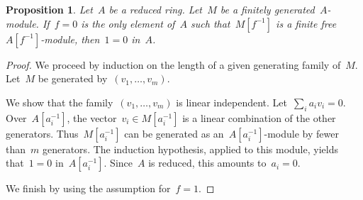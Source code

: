 \documentclass{amsart}
\theoremstyle{definition}
\theoremstyle{plain}
\newtheorem{prop}[defn]{Proposition}
\theoremstyle{remark}
\begin{document}
\begin{prop}Let~$A$ be a reduced ring. Let~$M$ be a finitely
generated~$A$-module. If~$f = 0$ is the only element of~$A$ such
that~$M[f^{-1}]$ is a finite free~$A[f^{-1}]$-module, then~$1 = 0$ in~$A$.
\end{prop}

\begin{proof}We proceed by induction on the length of a given generating family
of~$M$. Let~$M$ be generated by~$(v_1,\ldots,v_m)$.

We show that the family~$(v_1,\ldots,v_m)$ is linear independent. Let~$\sum_i
a_i v_i = 0$. Over~$A[a_i^{-1}]$, the vector~$v_i \in M[a_i^{-1}]$ is a linear
combination of the other generators. Thus~$M[a_i^{-1}]$ can be generated as
an~$A[a_i^{-1}]$-module by fewer than~$m$ generators. The induction hypothesis,
applied to this module, yields that~$1 = 0$ in~$A[a_i^{-1}]$. Since~$A$ is
reduced, this amounts to~$a_i = 0$.

We finish by using the assumption for~$f = 1$.
\end{proof}
\end{document}
